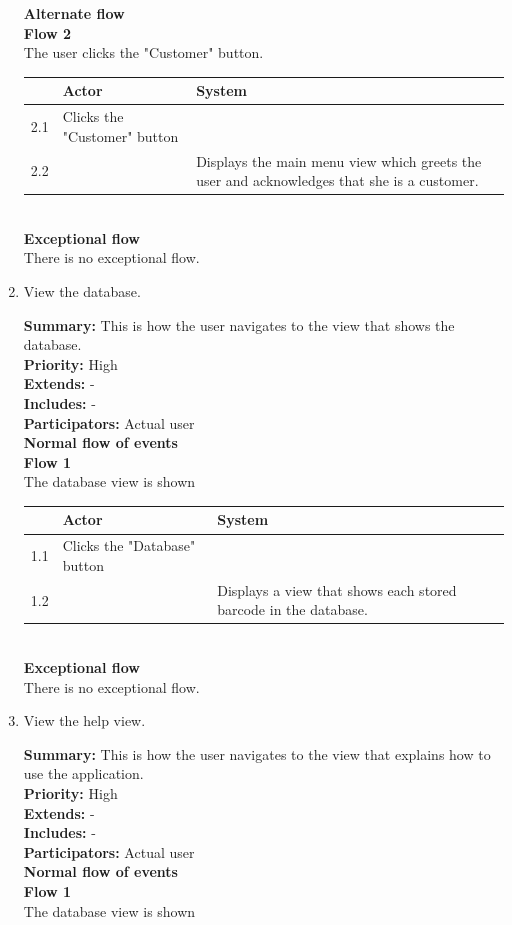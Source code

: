 \documentclass{report}
\begin{document}
\begin{enumerate}
    \textbf{Alternate flow} \\
    \textbf{Flow 2} \\ The user clicks the "Customer" button. \\

    \begin{tabular}{ | p{1cm} | p{3cm} | p{4cm} |}
    \hline
      & Actor & System \\ \hline
    2.1 & Clicks the "Customer" button & \\ \hline
    2.2 & & Displays the main menu view which greets the user and acknowledges that she is a customer. \\
    \hline
    \end{tabular} \\

    \textbf{Exceptional flow} \\ There is no exceptional flow.

  \item View the database. \

    \textbf{Summary:} This is how the user navigates to the view that shows the database. \\
    \textbf{Priority:} High \\
    \textbf{Extends:} - \\
    \textbf{Includes:} - \\
    \textbf{Participators:} Actual user \\
    \textbf{Normal flow of events} \\
    \textbf{Flow 1} \\ The database view is shown \\

    \begin{tabular}{ | p{1cm} | p{3cm} | p{4cm} |}
    \hline
      & Actor & System \\ \hline
    1.1 & Clicks the "Database" button & \\ \hline
    1.2 & & Displays a view that shows each stored barcode in the database. \\
    \hline
    \end{tabular} \\

    \textbf{Exceptional flow} \\ There is no exceptional flow. \

  \item View the help view. \

    \textbf{Summary:} This is how the user navigates to the view that explains how to use the application. \\
    \textbf{Priority:} High \\
    \textbf{Extends:} - \\
    \textbf{Includes:} - \\
    \textbf{Participators:} Actual user \\
    \textbf{Normal flow of events} \\
    \textbf{Flow 1} \\ The database view is shown \\


\end{enumerate}
\end{document}

